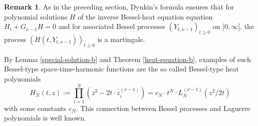 \documentclass[reqno]{amsart}
\theoremstyle{plain}
\theoremstyle{definition}
\newtheorem{remark}[theorem]{Remark}
\numberwithin{equation}{section}
\begin{document}
\begin{remark} As in the preceding section, Dynkin's formula ensures that for polynomial  solutions $H$
  of the inverse  Bessel-heat equation equation $H_t+ G_{\nu-1}H=0$ and for associated Bessel processes 
 $(Y_{t,\nu-1})_{t\ge0}$ on $[0,\infty[$, the process  $(H(t,Y_{t,\nu-1} ))_{t\ge0}$ is a martingale.

      By Lemma \ref{special-solution-b} and Theorem \ref{heat-equation-b},
examples of such  Bessel-type space-time-harmonic functions are the so called Bessel-type heat polynomials
\begin{equation}\label{heat-pol-b}
   H_N(t,z):=\prod_{i=1}^N (z^2-2t\cdot z_i^{(\nu-1)})=
   c_N\cdot t^{N}\cdot L_N^{(\nu-1)}(z^2/2t)
   \end{equation}
with some constants $c_N$. This connection between Bessel processes and Laguerre polynomials is  well known.
\end{remark}
\end{document}
